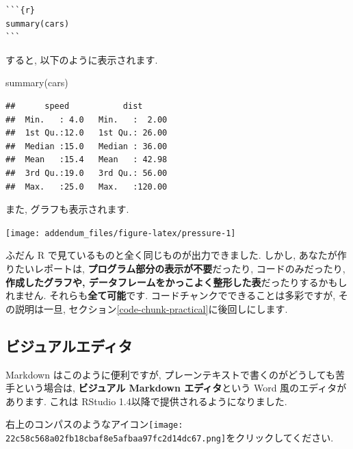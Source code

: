 \documentclass[
]{ltjsarticle}
\newenvironment{Shaded}{\begin{snugshade}}{\end{snugshade}}
\newcommand{\FunctionTok}[1]{\textcolor[rgb]{0.00,0.00,0.00}{#1}}
\newcommand{\NormalTok}[1]{#1}
\begin{document}
\begin{verbatim}
```{r}
summary(cars)
```
\end{verbatim}

すると, 以下のように表示されます.

\begin{Shaded}
\begin{Highlighting}[numbers=left,,]
\FunctionTok{summary}\NormalTok{(cars)}
\end{Highlighting}
\end{Shaded}

\begin{verbatim}
##      speed           dist       
##  Min.   : 4.0   Min.   :  2.00  
##  1st Qu.:12.0   1st Qu.: 26.00  
##  Median :15.0   Median : 36.00  
##  Mean   :15.4   Mean   : 42.98  
##  3rd Qu.:19.0   3rd Qu.: 56.00  
##  Max.   :25.0   Max.   :120.00
\end{verbatim}

また, グラフも表示されます.

\begin{center}\texttt{[image: addendum\_files/figure-latex/pressure-1]} \end{center}

ふだん R で見ているものと全く同じものが出力できました. しかし, あなたが作りたいレポートは, \textbf{プログラム部分の表示が不要}だったり, コードのみだったり, \textbf{作成したグラフや, データフレームをかっこよく整形した表}だったりするかもしれません. それらも\textbf{全て可能}です. コードチャンクでできることは多彩ですが, その説明は一旦, セクション\ref{code-chunk-practical}に後回しにします.

\hypertarget{ux30d3ux30b8ux30e5ux30a2ux30ebux30a8ux30c7ux30a3ux30bf}{%
\subsection{ビジュアルエディタ}\label{ux30d3ux30b8ux30e5ux30a2ux30ebux30a8ux30c7ux30a3ux30bf}}

Markdown はこのように便利ですが, プレーンテキストで書くのがどうしても苦手という場合は, \textbf{ビジュアル Markdown エディタ}という Word 風のエディタがあります. これは RStudio 1.4以降で提供されるようになりました.

右上のコンパスのようなアイコン\texttt{[image: 22c58c568a02fb18cbaf8e5afbaa97fc2d14dc67.png]}をクリックしてください.
\end{document}
